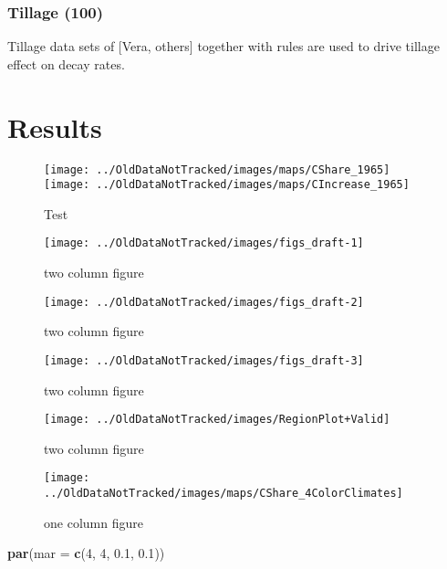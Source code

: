 \documentclass[gc, manuscript]{copernicus}
\newenvironment{Shaded}{\begin{snugshade}}{\end{snugshade}}
\newcommand{\DataTypeTok}[1]{\textcolor[rgb]{0.13,0.29,0.53}{#1}}
\newcommand{\DecValTok}[1]{\textcolor[rgb]{0.00,0.00,0.81}{#1}}
\newcommand{\FloatTok}[1]{\textcolor[rgb]{0.00,0.00,0.81}{#1}}
\newcommand{\KeywordTok}[1]{\textcolor[rgb]{0.13,0.29,0.53}{\textbf{#1}}}
\newcommand{\NormalTok}[1]{#1}
\begin{document}
\subsubsection{Tillage (100)}

Tillage data sets of {[}Vera, others{]} together with rules are used to
drive tillage effect on decay rates. \newpage

\section{Results}

\begin{figure}
\texttt{[image: ../OldDataNotTracked/images/maps/CShare\_1965]} \texttt{[image: ../OldDataNotTracked/images/maps/CIncrease\_1965]} \caption{Test}\label{fig:unnamed-chunk-6}
\end{figure}

\begin{figure}
\texttt{[image: ../OldDataNotTracked/images/figs\_draft-1]} \caption{two column figure}\label{fig:unnamed-chunk-7}
\end{figure}

\begin{figure}
\texttt{[image: ../OldDataNotTracked/images/figs\_draft-2]} \caption{two column figure}\label{fig:unnamed-chunk-8}
\end{figure}

\begin{figure}
\texttt{[image: ../OldDataNotTracked/images/figs\_draft-3]} \caption{two column figure}\label{fig:unnamed-chunk-9}
\end{figure}

\begin{figure}
\texttt{[image: ../OldDataNotTracked/images/RegionPlot+Valid]} \caption{two column figure}\label{fig:unnamed-chunk-10}
\end{figure}

\begin{figure}
\texttt{[image: ../OldDataNotTracked/images/maps/CShare\_4ColorClimates]} \caption{one column figure}\label{fig:unnamed-chunk-11}
\end{figure}

\begin{Shaded}
\begin{Highlighting}[]
\KeywordTok{par}\NormalTok{(}\DataTypeTok{mar =} \KeywordTok{c}\NormalTok{(}\DecValTok{4}\NormalTok{, }\DecValTok{4}\NormalTok{, }\FloatTok{0.1}\NormalTok{, }\FloatTok{0.1}\NormalTok{))}
\end{Highlighting}
\end{Shaded}
\end{document}
